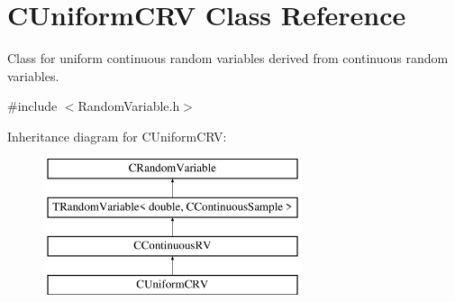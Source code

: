 \hypertarget{class_c_uniform_c_r_v}{\section{C\-Uniform\-C\-R\-V Class Reference}
\label{class_c_uniform_c_r_v}
}


Class for uniform continuous random variables derived from continuous random variables.  




{\ttfamily \#include $<$Random\-Variable.\-h$>$}

Inheritance diagram for C\-Uniform\-C\-R\-V\-:\begin{figure}[H]
\begin{center}
\leavevmode
\includegraphics[height=4.000000cm]{class_c_uniform_c_r_v}
\end{center}
\end{figure}
